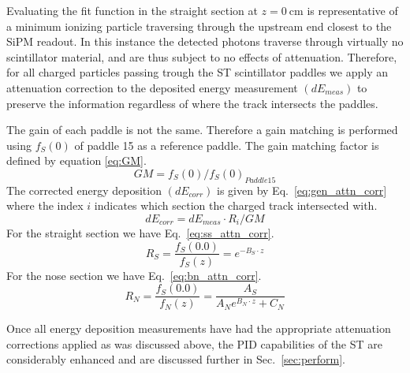 Evaluating the fit function in the straight section at $z = 0\ \mathrm{cm}$ is representative of a minimum ionizing particle traversing through the upstream end closest to the SiPM readout.  In this instance the detected photons traverse through virtually no scintillator material, and are thus subject to no effects of attenuation.  Therefore, for all charged particles passing trough the ST scintillator paddles we apply an attenuation correction to the deposited energy measurement $(dE_{meas})$ to preserve the information regardless of where the track intersects the paddles.  

The gain of each paddle is not the same. Therefore a gain matching is performed using $f_{S}(0)$ of paddle 15 as a reference paddle. The gain matching factor is defined by equation 
 \ref{eq:GM}.
	\begin{equation} \label{eq:GM}
		GM = f_{S}(0)/f_{S}(0)_{Paddle 15}
	\end{equation}
	The corrected energy deposition $(dE_{corr})$ is given by Eq.~\ref{eq:gen_attn_corr} where the index $i$ indicates which section the charged track intersected with.
	\begin{equation} \label{eq:gen_attn_corr}
		dE_{corr} = dE_{meas} \cdot R_{i} /GM
	\end{equation}
For the straight section we have Eq.~\ref{eq:ss_attn_corr}.
	\begin{equation} \label{eq:ss_attn_corr}
		R_{S} = \frac{f_{S}(0.0)}{f_{S}(z)} = e^{-B_{S} \cdot z}
	\end{equation}
For the nose section we have Eq.~\ref{eq:bn_attn_corr}.
	\begin{equation} \label{eq:bn_attn_corr}
		R_{N} = \frac{f_{S}(0.0)}{f_{N}(z)} = \frac{A_{S}}{A_{N}e^{B_{N} \cdot z} + C_{N}}
	\end{equation}

Once all energy deposition measurements have had the appropriate attenuation corrections applied as was discussed above, the PID capabilities of the ST are considerably enhanced and are discussed further in Sec.~\ref{sec:perform}.

